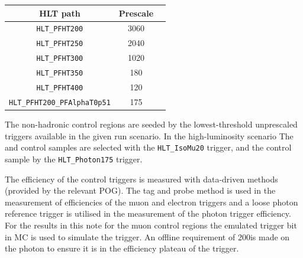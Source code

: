 \begin{table}[h!]
\footnotesize
\centering
\begin{tabular}{c|cc} 
\hline
\hline
HLT path & \multicolumn{1}{c}{Prescale} \\
\hline
\texttt{HLT\_PFHT200} & 3060 \\
\texttt{HLT\_PFHT250} & 2040 \\
\texttt{HLT\_PFHT300} & 1020 \\
\texttt{HLT\_PFHT350} & 180  \\
\texttt{HLT\_PFHT400} & 120  \\
\texttt{HLT\_PFHT200\_PFAlphaT0p51} & 175 \\
\hline
\hline

\end{tabular}
\label{tab:2015_Hadronic_Control_Triggers}
\end{table}


The non-hadronic control regions are seeded by the lowest-threshold unprescaled 
triggers available in the given run scenario. In the high-luminosity scenario The 
\mj and \mmj control samples are selected with the \verb!HLT_IsoMu20! trigger,
and the \gj control sample by the \verb!HLT_Photon175! trigger. 

The efficiency of the control triggers is measured with data-driven methods
(provided by the relevant POG). The tag and probe method is used in the measurement of
efficiencies of the muon and electron triggers and a loose photon reference trigger 
is utilised in the measurement of the photon trigger efficiency. For the results in 
this note for the muon control regions the emulated trigger bit in MC is used to simulate 
the trigger. An offline \Pt requirement of 200\GeV is made on the photon
to ensure it is in the efficiency plateau of the trigger.



